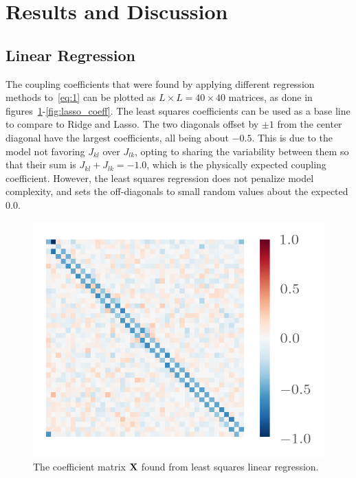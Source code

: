 \section{Results and Discussion}\label{sec:Discussion}

\subsection{Linear Regression}

The coupling coefficients that were found by applying different regression methods
to~\eqref{eq:1} can be plotted as \(L\times L = 40\times 40\) matrices, as done
in figures~\ref{fig:lm_coeff}-\ref{fig:lasso_coeff}. The least squares
coefficients can be used as a base line to compare to Ridge and Lasso. The two
diagonals offset by \(\pm 1\) from the center diagonal have the largest
coefficients, all being about \(-0.5\). This is due to the model not
favoring \(J_{kl}\) over \(J_{lk}\), opting to sharing the variability between
them so that their sum is \(J_{kl} + J_{lk} = -1.0\), which is the physically
expected coupling coefficient. However, the least squares regression does not
penalize model complexity, and sets the off-diagonals to small random values
about the expected \(0.0\). 
\begin{figure}[H]
  \centering
  \includegraphics[]{figures/lm_coeff.png}
  \caption{\label{fig:lm_coeff} The coefficient matrix \(\vb{X}\) found from
    least squares linear regression.}
\end{figure}

